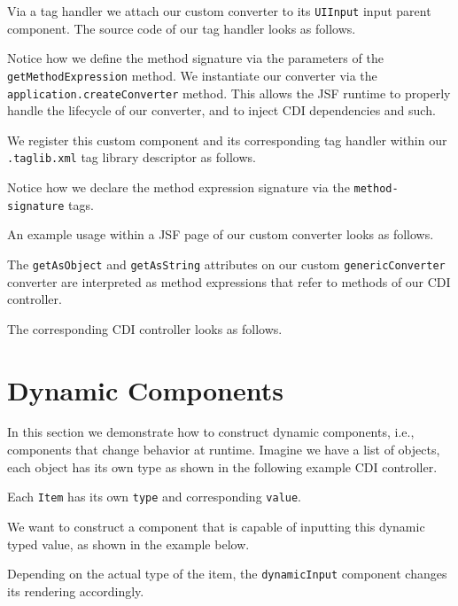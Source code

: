 Via a tag handler we attach our custom converter to its \texttt{UIInput} input parent component.
The source code of our tag handler looks as follows.

Notice how we define the method signature via the parameters of the \texttt{getMethod\allowbreak Expression} method.
We instantiate our converter via the \texttt{application.createConverter} method.
This allows the JSF runtime to properly handle the lifecycle of our converter, and to inject CDI dependencies and such.

We register this custom component and its corresponding tag handler within our \texttt{.taglib.xml} tag library descriptor as follows.

Notice how we declare the method expression signature via the \texttt{method-signature} tags.

An example usage within a JSF page of our custom converter looks as follows.

The \texttt{getAsObject} and \texttt{getAsString} attributes on our custom \texttt{genericConverter} converter are interpreted as method expressions that refer to methods of our CDI controller.

The corresponding CDI controller looks as follows.



\section{Dynamic Components}
\label{sec:dynamic-components}
In this section we demonstrate how to construct dynamic components, i.e., components that change behavior at runtime.
Imagine we have a list of objects, each object has its own type as shown in the following example CDI controller.

Each \texttt{Item} has its own \texttt{type} and corresponding \texttt{value}.

We want to construct a component that is capable of inputting this dynamic typed value, as shown in the example below.

Depending on the actual type of the item, the \texttt{dynamicInput} component changes its rendering accordingly.

